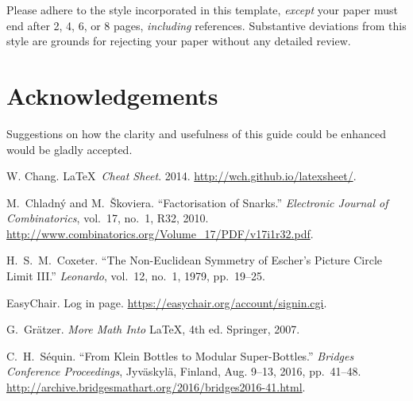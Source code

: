 \documentclass[letterpaper,11pt]{article}
\begin{document}
Please adhere to the style incorporated in this template, \emph{except} your paper
must end after 2, 4, 6, or 8 pages, \emph{including} references. Substantive
deviations from this style are grounds for rejecting your paper without
any detailed review.


\section*{Acknowledgements}

Suggestions on how the clarity and usefulness of this guide could be
enhanced would be gladly accepted.

    
{\setlength{\baselineskip}{13pt} %
\raggedright				%
\begin{thebibliography}{99}

W. Chang. \LaTeX\ \textit{Cheat Sheet}. 2014. \url{http://wch.github.io/latexsheet/}.

M.\ Chladn\'y and M.\ \v Skoviera. ``Factorisation of Snarks.'' \textit{Electronic Journal
of Combinatorics}, vol.~17, no.~1, R32, 2010.
\url{http://www.combinatorics.org/Volume_17/PDF/v17i1r32.pdf}.

 H.\ S.\ M.\ Coxeter. ``The Non-Euclidean Symmetry of Escher's Picture
Circle Limit III.'' \textit{Leonardo}, vol.~12, no.~1, 1979, pp.~19--25.

 EasyChair. Log in page. \url{https://easychair.org/account/signin.cgi}.

 G.\ Gr\"atzer. \textit{More Math Into} \LaTeX, 4th ed. Springer, 2007.

 C.\ H.\ S\'equin. ``From Klein Bottles to Modular Super-Bottles.'' 
\textit{Bridges Conference Proceedings}, Jyv\"askyl\"a, Finland, Aug. 9--13,
2016, pp.~41--48. \url{http://archive.bridgesmathart.org/2016/bridges2016-41.html}.


\end{thebibliography}
} %
   
\end{document}
